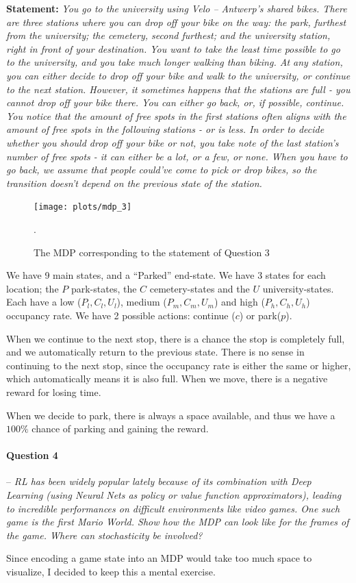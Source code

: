 \documentclass[a4paper]{article}
\newcommand{\question}[2]{
\paragraph{Question #1} -- \textit{#2}

}
\begin{document}
			\textbf{Statement:}  \emph{You go to the university using Velo -- Antwerp's shared bikes. 
				There are three stations where you can drop off your bike on the way: the park, furthest from the university; the cemetery, second furthest; and the university station, right in front of your destination.
				You want to take the least time possible to go to the university, and you take much longer walking than biking.
				At any station, you can either decide to drop off your bike and walk to the university, or continue to the next station.
				However, it sometimes happens that the stations are full - you cannot drop off your bike there. You can either go back, or, if possible, continue.
				You notice that the amount of free spots in the first stations often aligns with the amount of free spots in the following stations - or is less. 
				In order to decide whether you should drop off your bike or not, you take note of the last station's number of free spots - it can either be a lot, or a few, or none.
				When you have to go back, we assume that people could've come to pick or drop bikes, so the transition doesn't depend on the previous state of the station.}

			\begin{figure}[H]
				\centering
				\texttt{[image: plots/mdp\_3]}
				\caption{The MDP corresponding to the statement of Question 3}.
				\label{fig:q3}
			\end{figure}{}

			We have 9 main states, and a ``Parked'' end-state. We have 3 states for each location; the $P$ park-states, the $C$ cemetery-states and the $U$ university-states.
			Each have a low ($P_l, C_l, U_l$), medium ($P_m, C_m, U_m$) and high ($P_h, C_h, U_h$) occupancy rate.
			We have 2 possible actions: continue ($c$) or park($p$).

			When we continue to the next stop, there is a chance the stop is completely full, and we automatically return to the previous state.
			There is no sense in continuing to the next stop, since the occupancy rate is either the same or higher, which automatically means it is also full.
			When we move, there is a negative reward for losing time.

			When we decide to park, there is always a space available, and thus we have a $100\%$ chance of parking and gaining the reward.

		\question{4}{RL has been widely popular lately because of its combination with Deep Learning (using Neural Nets as policy or value function approximators), leading to incredible performances on difficult environments like video games. 
				One such game is the first Mario World. 
				Show how the MDP can look like for the frames of the game. 
				Where can stochasticity be involved?}
			Since encoding a game state into an MDP would take too much space to visualize, I decided to keep this a mental exercise.
\end{document}
